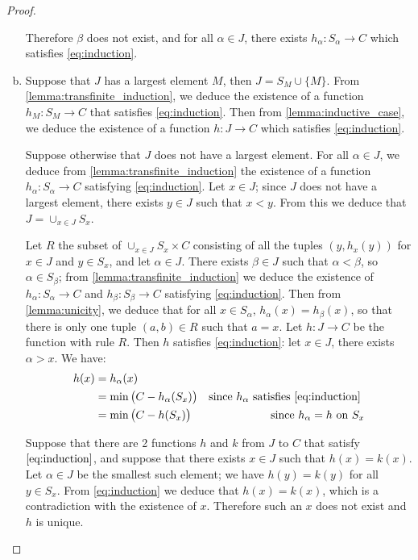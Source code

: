 \documentclass[11pt,a4paper,twoside]{article}
\theoremstyle{definition}
\theoremstyle{plain}
\begin{document}
\begin{proof}
\begin{enumerate}[(a)]
    Therefore $\beta$ does not exist, and for all $\alpha \in J$, there exists $h_\alpha : S_\alpha \to C$ which satisfies \eqref{eq:induction}.

  \item
    Suppose that $J$ has a largest element $M$, then $J = S_M \cup \{ M \}$. From \ref{lemma:transfinite_induction}, we deduce
    the existence of a function $h_M : S_M \to C$ that satisfies \eqref{eq:induction}. Then from \ref{lemma:inductive_case},
    we deduce the existence of a function $h : J \to C$ which satisfies \eqref{eq:induction}.

    Suppose otherwise that $J$ does not have a largest element. For all $\alpha \in J$, we deduce from \ref{lemma:transfinite_induction}
    the existence of a function $h_\alpha : S_\alpha \to C$ satisfying \eqref{eq:induction}.
    Let $x \in J$; since $J$ does not have a largest element, there exists $y \in J$ such that $x < y$. From this we deduce that
    $J = \cup_{x \in J} S_x$.

    Let $R$ the subset of $\cup_{x \in J} S_x \times C$ consisting of all the tuples $\left( y, h_x ( y ) \right)$ for $x \in J$ and $y \in S_x$,
    and let $\alpha \in J$. There exists $\beta \in J$ such that $\alpha < \beta$, so $\alpha \in S_\beta$; from \ref{lemma:transfinite_induction}
    we deduce the existence of $h_\alpha : S_\alpha \to C$ and $h_\beta : S_\beta \to C$ satisfying \eqref{eq:induction}.
    Then from \ref{lemma:unicity}, we deduce that for all $x \in S_\alpha$, $h_\alpha ( x ) = h_\beta ( x )$, so that there is only
    one tuple $( a, b ) \in R$ such that $a = x$. Let $h : J \to C$ be the function with rule $R$. Then $h$ satisfies \eqref{eq:induction}:
    let $x \in J$, there exists $\alpha > x$. We have:
    \begin{align*}
      h ( x ) &= h_\alpha ( x ) \\
      &= \min \big( C - h_\alpha ( S_x ) \big) &\text{since } h_\alpha \text{ satisfies \eqref{eq:induction} } \\
      &= \min \big( C - h ( S_x ) \big) &\text{ since } h_\alpha = h \text{ on } S_x
    \end{align*}

    Suppose that there are 2 functions $h$ and $k$ from $J$ to $C$ that satisfy $\eqref{eq:induction}$, and suppose that there exists $x \in J$
    such that $h ( x ) = k ( x )$. Let $\alpha \in J$ be the smallest such element; we have $h ( y ) = k ( y )$ for all
    $y \in S_x$. From \eqref{eq:induction} we deduce that $h ( x ) = k ( x )$, which is a contradiction with the existence of $x$.
    Therefore such an $x$ does not exist and $h$ is unique.

  \end{enumerate}

\end{proof}
\end{document}
